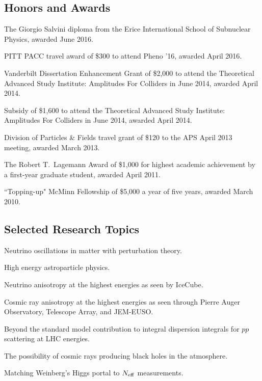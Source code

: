 \documentclass[letterpaper]{article}
\renewenvironment{itemize}{
\begin{list}{}{
\setlength{\leftmargin}{1.5em}
}
}{
\end{list}
}
\begin{document}
\subsection*{Honors and Awards}
\begin{itemize}
\item The Giorgio Salvini diploma from the Erice International School of Subnuclear Physics, awarded June 2016.
\item PITT PACC travel award of \$300 to attend Pheno '16, awarded April 2016.
\item Vanderbilt Dissertation Enhancement Grant of \$2,000 to attend the Theoretical Advanced Study Institute: Amplitudes For Colliders
in June 2014, awarded April 2014.
\item Subsidy of \$1,600 to attend the Theoretical Advanced Study Institute: Amplitudes For Colliders in June 2014, awarded April 2014.
\item Division of Particles \& Fields travel grant of \$120 to the APS April 2013 meeting, awarded March 2013.
\item The Robert T.~Lagemann Award of \$1,000 for highest academic achievement by a first-year graduate student, awarded April 2011.
\item ``Topping-up" McMinn Fellowship of \$5,000 a year of five years, awarded March 2010.
\end{itemize}

\subsection*{Selected Research Topics}
\begin{itemize}
\item Neutrino oscillations in matter with perturbation theory.
\item High energy astroparticle physics.
\item Neutrino anisotropy at the highest energies as seen by IceCube.
\item Cosmic ray anisotropy at the highest energies as seen through Pierre Auger Observatory, Telescope Array, and JEM-EUSO.
\item Beyond the standard model contribution to integral dispersion integrals for $pp$ scattering at LHC energies.
\item The possibility of cosmic rays producing black holes in the atmosphere.
\item Matching Weinberg's Higgs portal to $N_{\rm{eff}}$ measurements.
\end{itemize}
\end{document}
